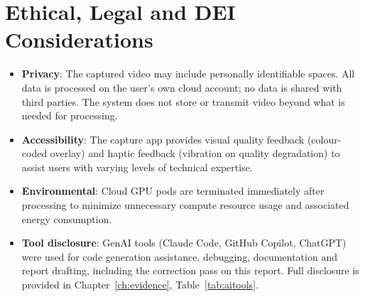 \section{Ethical, Legal and DEI Considerations}
\begin{itemize}
    \item \textbf{Privacy}: The captured video may include personally identifiable spaces. All data is processed on the user's own cloud account; no data is shared with third parties. The system does not store or transmit video beyond what is needed for processing.
    \item \textbf{Accessibility}: The capture app provides visual quality feedback (colour-coded overlay) and haptic feedback (vibration on quality degradation) to assist users with varying levels of technical expertise.
    \item \textbf{Environmental}: Cloud GPU pods are terminated immediately after processing to minimize unnecessary compute resource usage and associated energy consumption.
    \item \textbf{Tool disclosure}: GenAI tools (Claude Code, GitHub Copilot, ChatGPT) were used for code generation assistance, debugging, documentation and report drafting, including the correction pass on this report. Full disclosure is provided in Chapter~\ref{ch:evidence}, Table~\ref{tab:aitools}.
\end{itemize}
